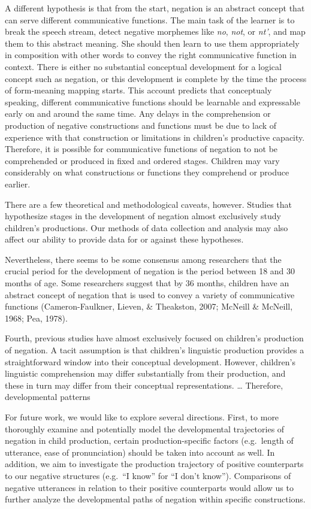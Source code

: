 \documentclass[
  english,
  man,floatsintext]{apa6}
\begin{document}
A different hypothesis is that from the start, negation is an abstract concept that can serve different communicative functions. The main task of the learner is to break the speech stream, detect negative morphemes like \emph{no}, \emph{not}, or \emph{nt'}, and map them to this abstract meaning. She should then learn to use them appropriately in composition with other words to convey the right communicative function in context. There is either no substantial conceptual development for a logical concept such as negation, or this development is complete by the time the process of form-meaning mapping starts. This account predicts that conceptualy speaking, different communicative functions should be learnable and expressable early on and around the same time. Any delays in the comprehension or production of negative constructions and functions must be due to lack of experience with that construction or limitations in children's productive capacity. Therefore, it is possible for communicative functions of negation to not be comprehended or produced in fixed and ordered stages. Children may vary considerably on what constructions or functions they comprehend or produce earlier.

There are a few theoretical and methodological caveats, however. Studies that hypothesize stages in the development of negation almost exclusively study children's productions. Our methods of data collection and analysis may also affect our ability to provide data for or against these hypotheses.

Nevertheless, there seems to be some consensus among researchers that the crucial period for the development of negation is the period between 18 and 30 months of age. Some researchers suggest that by 36 months, children have an abstract concept of negation that is used to convey a variety of communicative functions (Cameron-Faulkner, Lieven, \& Theakston, 2007; McNeill \& McNeill, 1968; Pea, 1978).

Fourth, previous studies have almost exclusively focused on children's production of negation. A tacit assumption is that children's linguistic production provides a straightforward window into their conceptual development. However, children's linguistic comprehension may differ substantially from their production, and these in turn may differ from their conceptual representations. \ldots{} Therefore, developmental patterns

For future work, we would like to explore several directions. First, to more thoroughly examine and potentially model the developmental trajectories of negation in child production, certain production-specific factors (e.g.~length of utterance, ease of pronunciation) should be taken into account as well. In addition, we aim to investigate the production trajectory of positive counterparts to our negative structures (e.g.~``I know'' for ``I don't know''). Comparisons of negative utterances in relation to their positive counterparts would allow us to further analyze the developmental paths of negation within specific constructions.
\end{document}
